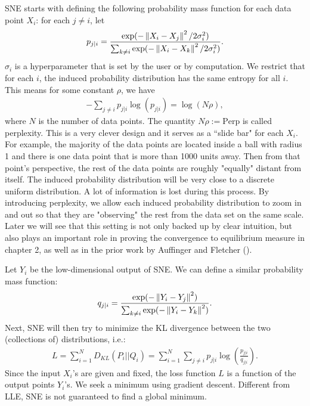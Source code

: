 SNE starts with defining the following probability mass function for each data
point $X_i$: for each $j \neq i$, let
\begin{align}\label{SNE_input_kernel}
    p_{j|i} = \frac{\exp(-\left\lVert X_i - X_j\right\rVert^2/2\sigma_i^2)}{\sum_{k \neq i}\exp(-\left\lVert X_i - X_k\right\rVert^2/2\sigma_i^2)}.
\end{align}
$\sigma_i$ is a hyperparameter that is set by the user or by computation. We restrict that for each $i$, the induced probability distribution has the same entropy for all $i$. This means for some constant $\rho$, we have
\begin{align} \label{SNE_input_entropy}
    -\sum_{j \neq i} p_{j|i} \log\left(p_{j|i}\right) = \log(N\rho),
\end{align}
where $N$ is the number of data points. The quantity $N\rho := \text{Perp}$ is called perplexity. This is a very clever design and it serves as a ``slide bar" for each $X_i$. For example, the majority of the data points are located inside a ball with radius 1 and there is one data point that is more than 1000 units away. Then from that point's perspective, the rest of the data points are roughly "equally" distant from itself. The induced probability distribution will be very close to a discrete uniform distribution. A lot of information is lost during this process. By introducing perplexity, we allow each induced probability distribution to zoom in and out so that they are "observing" the rest from the data set on the same scale. Later we will see that this setting is not only backed up by clear intuition, but also plays an important role in proving the convergence to equilibrium measure in chapter 2, as well as in the prior work by Auffinger and Fletcher (\cite{auffinger-tsne}).

Let $Y_i$ be the low-dimensional output of SNE. We can define a similar
probability mass function:
\begin{align} \label{SNE_output_kernel}
    q_{j|i} = \frac{\exp(-\left\lVert Y_i - Y_j\right\rVert^2)}{\sum_{k \neq i}\exp(-\left\lVert Y_i - Y_k\right\rVert^2)}.
\end{align}
Next, SNE will then try to minimize the KL divergence between the two (collections of) distributions, i.e.:
\begin{align} \label{SNE_loss_function}
    L = \sum_{i=1}^N D_{KL}(P_i||Q_i) = \sum_{i=1}^N \sum_{j \neq i} p_{j|i} \log\left(\frac{p_{j|i}}{q_{j|i}}\right).
\end{align}
Since the input $X_i$'s are given and fixed, the loss function $L$ is a function of the output points $Y_i$'s. We seek a minimum using gradient descent. Different from LLE, SNE is not guaranteed to find a global minimum.

